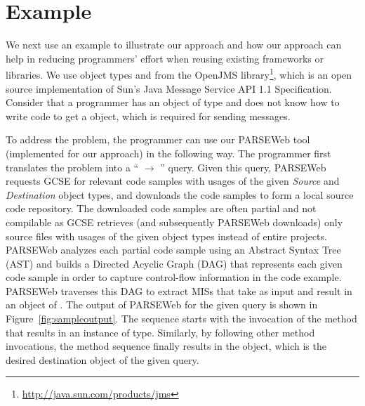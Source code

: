 \section{Example}
\label{sec:example}
We next use an example to illustrate our approach and how our
approach can help in reducing programmers' effort when reusing
existing frameworks or libraries. We use object types
 and  from the
OpenJMS library\footnote{\url{http://java.sun.com/products/jms}},
which is an open source implementation of Sun's Java Message Service
API 1.1 Specification. Consider that a
programmer has an object of type  and
does not know how to write code to get a 
object, which is required for sending messages.

To address the problem, the programmer can use our PARSEWeb tool
(implemented for our approach) in the following way. The
programmer first translates the problem into
a `` $\rightarrow$
'' query. Given this query, PARSEWeb
requests GCSE for relevant code samples with usages of the given
\emph{Source} and \emph{Destination} object types, and downloads the
code samples to form a local source code repository. The downloaded
code samples are often partial and not compilable as GCSE retrieves
(and subsequently PARSEWeb downloads) only source files with usages
of the given object types instead of entire projects. PARSEWeb
analyzes each partial code sample using an Abstract Syntax Tree
(AST) and builds a Directed Acyclic Graph (DAG) that represents each
given code sample in order to capture control-flow information in
the code example. PARSEWeb traverses this DAG to extract MISs that
take  as input and result
in an object of . The output of
PARSEWeb for the given query is shown in Figure~\ref{fig:sampleoutput}.
The sequence starts with the invocation of
the  method that results in
an instance of  type. Similarly, by following
other method invocations, the method sequence finally results in the
 object, which is the desired
destination object of the given query.

